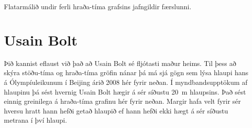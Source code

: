 \begin{tcolorbox}
\begin{theorem} \label{law:flatarmal}
Flatarmálið undir ferli hraða-tíma grafsins jafngildir færslunni. 
\end{theorem}
\end{tcolorbox}

\newpage

\section{Usain Bolt}

Þið kannist eflaust við það að Usain Bolt sé fljótasti maður heims. Til þess að skýra stöðu-tíma og hraða-tíma gröfin nánar þá má sjá gögn sem lýsa hlaupi hans á Ólympíuleikunum í Beijing árið 2008 hér fyrir neðan. Í myndbandsupptökum af hlaupinu þá sést hvernig Usain Bolt hægir á sér síðustu \SI{20}{m} hlaupsins. Það sést einnig greinilega á hraða-tíma grafinu hér fyrir neðan. Margir hafa velt fyrir sér hversu hratt hann hefði getað hlaupið ef hann hefði ekki hægt á sér síðustu metrana í því hlaupi.

